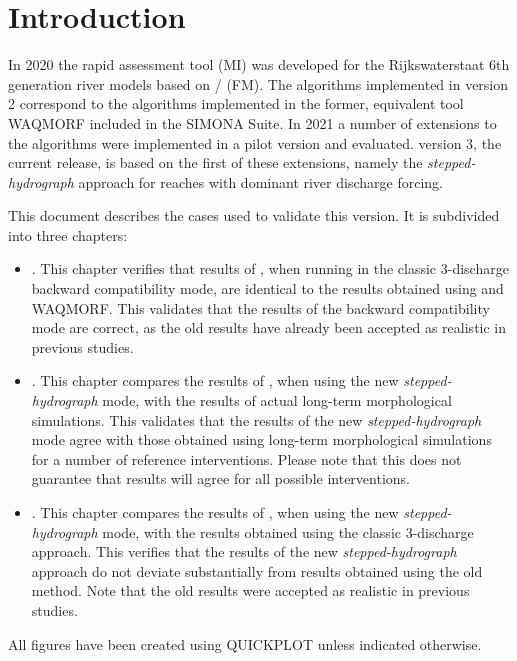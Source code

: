\chapter{Introduction}
In 2020 the rapid assessment tool \dfastmi (MI) was developed for the Rijkswaterstaat 6th generation river models based on \dhydrosuite / \dflowfmfull (FM).
The algorithms implemented in \dfmi version 2 correspond to the algorithms implemented in the former, equivalent tool WAQMORF included in the SIMONA Suite.
In 2021 a number of extensions to the \dfastmi algorithms were implemented in a pilot version and evaluated.
\dfmi version 3, the current release, is based on the first of these extensions, namely the \emph{stepped-hydrograph} approach for reaches with dominant river discharge forcing.

This document describes the cases used to validate this version.
It is subdivided into three chapters:

\begin{itemize}
\item {}. This chapter verifies that results of , when running in the classic 3-discharge backward compatibility mode, are identical to the results obtained using  and WAQMORF.
This validates that the results of the backward compatibility mode are correct, as the old results have already been accepted as realistic in previous studies.
\item {}. This chapter compares the results of , when using the new \emph{stepped-hydrograph} mode, with the results of actual long-term morphological simulations.
This validates that the results of the new \emph{stepped-hydrograph} mode agree with those obtained using long-term morphological simulations for a number of reference interventions.
Please note that this does not guarantee that results will agree for all possible interventions. 
\item {}. This chapter compares the results of , when using the new \emph{stepped-hydrograph} mode, with the results obtained using the classic 3-discharge approach.
This verifies that the results of the new \emph{stepped-hydrograph} approach do not deviate substantially from results obtained using the old method.
Note that the old results were accepted as realistic in previous studies.
\end{itemize}

All figures have been created using QUICKPLOT unless indicated otherwise.


